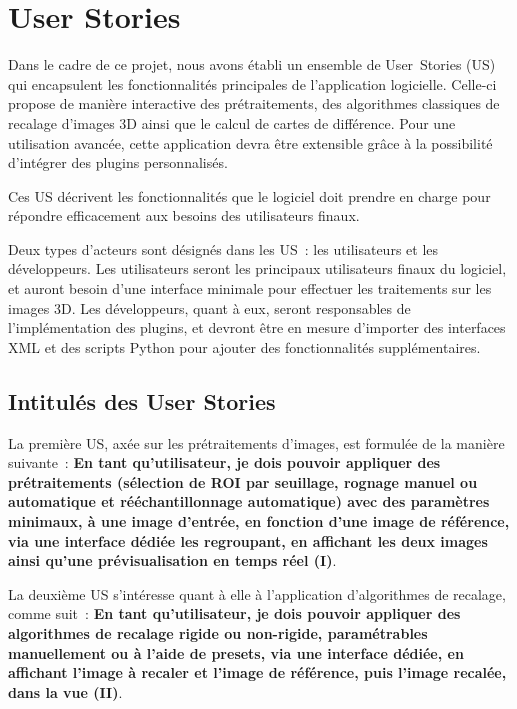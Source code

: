 \documentclass{article}
\begin{document}
{
    \section{User Stories}
    \label{sec:user-stories}

    Dans le cadre de ce projet, nous avons établi un ensemble de User~Stories (US) qui encapsulent les fonctionnalités principales de l'application logicielle. Celle-ci propose de manière interactive des prétraitements, des algorithmes classiques de recalage d'images 3D ainsi que le calcul de cartes de différence. Pour une utilisation avancée, cette application devra être extensible grâce à la possibilité d'intégrer des plugins personnalisés.

    Ces US décrivent les fonctionnalités que le logiciel doit prendre en charge pour répondre efficacement aux besoins des utilisateurs finaux.

    \bigskip

    Deux types d'acteurs sont désignés dans les US~: les utilisateurs et les développeurs. Les utilisateurs seront les principaux utilisateurs finaux du logiciel, et auront besoin d'une interface minimale pour effectuer les traitements sur les images 3D. Les développeurs, quant à eux, seront responsables de l'implémentation des plugins, et devront être en mesure d'importer des interfaces XML et des scripts Python pour ajouter des fonctionnalités supplémentaires.

    {
        \bigskip
        \subsection{Intitulés des User Stories}
        \label{subsec:user-stories}

        La première US, axée sur les prétraitements d'images, est formulée de la manière suivante~: \textbf{En tant qu'utilisateur, je dois pouvoir appliquer des prétraitements (sélection de ROI par seuillage, rognage manuel ou automatique et rééchantillonnage automatique) avec des paramètres minimaux, à une image d'entrée, en fonction d'une image de référence, via une interface dédiée les regroupant, en affichant les deux images ainsi qu'une prévisualisation en temps réel (I)}.
        \label{us:preprocessing}

        \bigskip

        La deuxième US s'intéresse quant à elle à l'application d'algorithmes de recalage, comme suit~: \textbf{En tant qu'utilisateur, je dois pouvoir appliquer des algorithmes de recalage rigide ou non-rigide, paramétrables manuellement ou à l'aide de presets, via une interface dédiée, en affichant l'image à recaler et l'image de référence, puis l'image recalée, dans la vue (II)}.
        \label{us:registration}

}}
\end{document}
